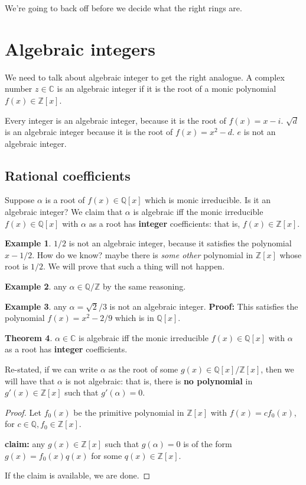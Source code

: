 \documentclass{book}
\newcommand{\Z}{\ensuremath{\mathbb{Z}}}
\newcommand{\Q}{\ensuremath{\mathbb{Q}}}
\newcommand{\C}{\ensuremath{\mathbb{C}}}
\theoremstyle{definition}
\newtheorem{theorem}{Theorem}
\newtheorem{example}[theorem]{Example}
\begin{document}
We're going to back off before we decide what the right rings are.

\section{Algebraic integers}
We need to talk about algebraic integer to get the right analogue. A complex
number $z \in \C$ is an algebraic integer if it is the root of a monic
polynomial $f(x) \in \Z[x]$.

Every integer is an algebraic integer, because it is the root of $f(x) = x - i$.
$\sqrt{d}$ is an algebraic integer because it is the root of $f(x) = x^2 - d$.
$e$ is not an algebraic integer.

\subsection{Rational coefficients}
Suppose $\alpha$ is a root of $f(x) \in \Q[x]$ which is monic irreducible.
Is it an algebraic integer? We claim that $\alpha$ is algebraic iff 
the monic irreducible $f(x) \in \Q[x]$ with $\alpha$ as a root has \textbf{integer} coefficients:
that is, $f(x) \in \Z[x]$.

\begin{example}
$1/2$ is not an algebraic integer, because it satisfies the polynomial $x - 1/2$.
How do we know? maybe there is \emph{some other} polynomial in $\Z[x]$ whose
root is $1/2$. We will prove that such a thing will not happen.
\end{example}


\begin{example}
any $\alpha \in \Q/\Z$ by the same reasoning.
\end{example}


\begin{example}
any $\alpha = \sqrt{2}/3$ is not an algebraic integer. \textbf{Proof:}
This satisfies the polynomial $f(x) = x^2 - 2/9$ which is in $\Q[x]$.
\end{example}

\begin{theorem}
$\alpha \in \C$ is algebraic iff 
the monic irreducible $f(x) \in \Q[x]$ with $\alpha$ as a root
    has \textbf{integer} coefficients.

Re-stated, if we can write $\alpha$ as the root of some $g(x) \in \Q[x]/\Z[x]$,
then we will have that $\alpha$ is not algebraic: that is, there is \textbf{no polynomial}
in $g'(x) \in \Z[x]$ such that $g'(\alpha)  = 0$.
\end{theorem}
\begin{proof}
    Let $f_0(x)$ be the primitive polynomial in $\Z[x]$ with $f(x) = c f_0(x)$,
    for $c \in \Q, f_0 \in \Z[x]$.

    \textbf{claim:} any $g(x) \in \Z[x]$ such that $g(\alpha) = 0$ is of the
    form $g(x) = f_0(x) q(x)$ for some $q(x) \in \Z[x]$.

    If the claim is available, we are done.
\end{proof}
\end{document}
